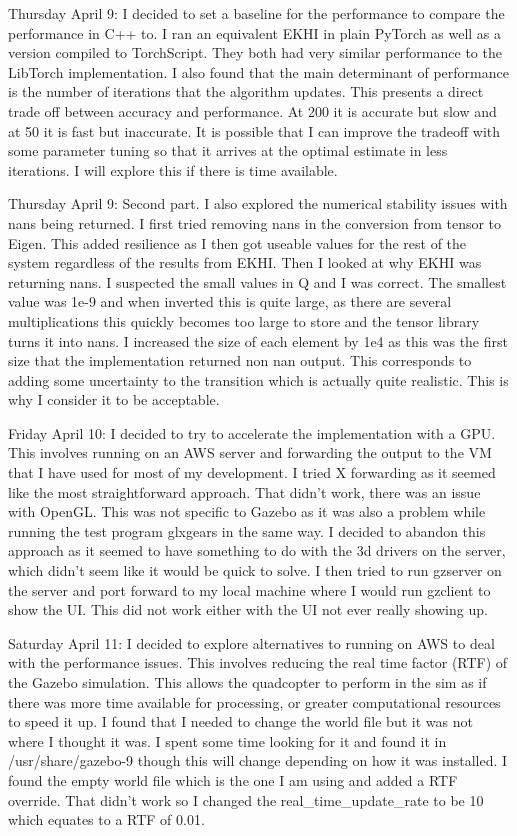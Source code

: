 \documentclass[]{../resources/final_report}
\begin{document}
\begin{appendices}
  Thursday April 9: I decided to set a baseline for the performance to compare the performance in C++ to. I ran an equivalent EKHI in plain PyTorch as well as a version compiled to TorchScript. They both had very similar performance to the LibTorch implementation. I also found that the main determinant of performance is the number of iterations that the algorithm updates. This presents a direct trade off between accuracy and performance. At 200 it is accurate but slow and at 50 it is fast but inaccurate. It is possible that I can improve the tradeoff with some parameter tuning so that it arrives at the optimal estimate in less iterations. I will explore this if there is time available.

  Thursday April 9: Second part. I also explored the numerical stability issues with nans being returned. I first tried removing nans in the conversion from tensor to Eigen. This added resilience as I then got useable values for the rest of the system regardless of the results from EKHI. Then I looked at why EKHI was returning nans. I suspected the small values in Q and I was correct. The smallest value was 1e-9 and when inverted this is quite large, as there are several multiplications this quickly becomes too large to store and the tensor library turns it into nans. I increased the size of each element by 1e4 as this was the first size that the implementation returned non nan output. This corresponds to adding some uncertainty to the transition which is actually quite realistic. This is why I consider it to be acceptable.

  Friday April 10: I decided to try to accelerate the implementation with a GPU. This involves running on an AWS server and forwarding the output to the VM that I have used for most of my development. I tried X forwarding as it seemed like the most straightforward approach. That didn’t work, there was an issue with OpenGL. This was not specific to Gazebo as it was also a problem while running the test program glxgears in the same way. I decided to abandon this approach as it seemed to have something to do with the 3d drivers on the server, which didn’t seem like it would be quick to solve. I then tried to run gzserver on the server and port forward to my local machine where I would run gzclient to show the UI. This did not work either with the UI not ever really showing up.

  Saturday April 11: I decided to explore alternatives to running on AWS to deal with the performance issues. This involves reducing the real time factor (RTF) of the Gazebo simulation. This allows the quadcopter to perform in the sim as if there was more time available for processing, or greater computational resources to speed it up. I found that I needed to change the world file but it was not where I thought it was. I spent some time looking for it and found it in /usr/share/gazebo-9 though this will change depending on how it was installed. I found the empty world file which is the one I am using and added a RTF override. That didn’t work so I changed the real\_time\_update\_rate to be 10 which equates to a RTF of 0.01.


\end{appendices}
\end{document}
